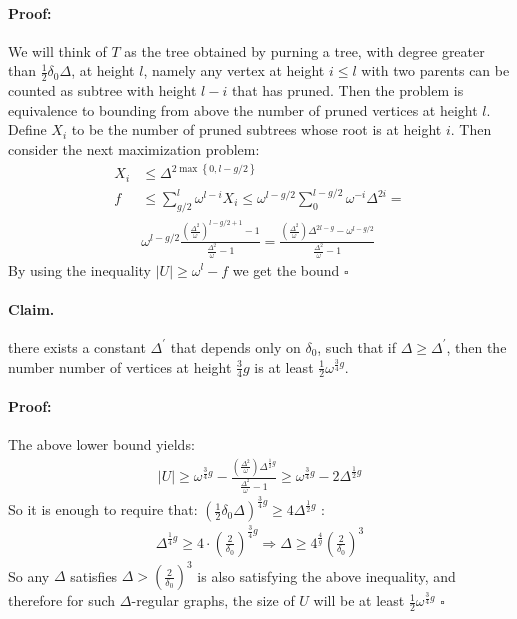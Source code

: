 \documentclass{article}
\begin{document}
\begin{multicols*}{2}
\paragraph{Proof:} We will think of $T$ as the tree obtained by purning a tree, with degree greater than $\frac{1}{2}\delta_{0}\Delta$, at height $l$, namely any vertex at height $i \le l $ with two parents can be counted as subtree with height $l-i$ that has pruned. Then the problem is equivalence to bounding from above the number of pruned vertices at height $l$. Define $X_{i}$ to be the number of pruned subtrees whose root is at height $i$. Then consider the next maximization problem: 
\begin{equation*}
  \begin{split}
    X_{i} & \le \Delta^{2\max \left\{ 0, l-g/2 \right\}} \\ 
    f & \le \sum_{g/2}^{l}{\omega^{l-i}X_{i} } \le \omega^{l-g/2}\sum_{0}^{l-g/2}{\omega^{-i}\Delta^{2i} } = \\ & \omega^{l-g/2}\frac{\left( \frac{\Delta^{2}}{\omega} \right)^{l-g/2+1}-1}{\frac{\Delta^{2}}{\omega}-1} =  
      \frac{\left( \frac{\Delta^{2}}{\omega} \right)\Delta^{2l-g} - \omega^{l-g/2} }{\frac{\Delta^{2}}{\omega}-1}
  \end{split}
\end{equation*}
By using the inequality $ |U| \ge \omega^{l} - f $ we get the bound $\square$ 
\paragraph{Claim.} there exists a constant $\Delta^{\prime}$ that depends only on $\delta_{0}$, such that if $\Delta \ge \Delta^{\prime}$, then the number number of vertices at height $\frac{3}{4}g$ is at least $ \frac{1}{2}\omega^{\frac{3}{4}g} $.

\paragraph{Proof:} The above lower bound yields: 
\begin{equation*}
  \begin{split}
    |U| \ge \omega^{\frac{3}{4}g} -  \frac{\left( \frac{\Delta^{2}}{\omega} \right)\Delta^{\frac{1}{2}g}  }{\frac{\Delta^{2}}{\omega}-1} \ge \omega^{\frac{3}{4}g} -  2 \Delta^{\frac{1}{2}g}  
  \end{split}
\end{equation*}
So it is enough to require that: $\left( \frac{1}{2}\delta_{0}\Delta  \right)^{\frac{3}{4}g} \ge 4 \Delta^{\frac{1}{2}g}$ :  
\begin{equation*}
  \begin{split}
    \Delta^{\frac{1}{4}g}\ge 4\cdot \left( \frac{2}{\delta_{0}} \right)^{\frac{3}{4}g} \Rightarrow\Delta \ge  4^{\frac{4}{g}} \left( \frac{2}{\delta_{0}} \right)^{3} 
  \end{split}
\end{equation*} So any $\Delta$ satisfies $\Delta> \left( \frac{2}{\delta_0} \right)^{3}$ is also satisfying the above inequality, and therefore for such $\Delta$-regular graphs, the size of $U$ will be at least $\frac{1}{2}\omega^{\frac{3}{4}g}$ $\square$   


\end{multicols*}
\end{document}
